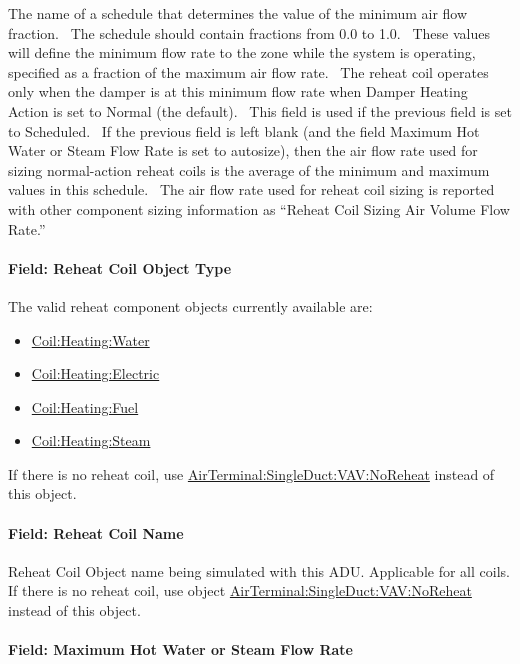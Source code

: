 The name of a schedule that determines the value of the minimum air flow fraction.~ The schedule should contain fractions from 0.0 to 1.0.~ These values will define the minimum flow rate to the zone while the system is operating, specified as a fraction of the maximum air flow rate.~ The reheat coil operates only when the damper is at this minimum flow rate when Damper Heating Action is set to Normal (the default).~ This field is used if the previous field is set to Scheduled.~ If the previous field is left blank (and the field Maximum Hot Water or Steam Flow Rate is set to autosize), then the air flow rate used for sizing normal-action reheat coils is the average of the minimum and maximum values in this schedule.~ The air flow rate used for reheat coil sizing is reported with other component sizing information as ``Reheat Coil Sizing Air Volume Flow Rate.''

\paragraph{Field: Reheat Coil Object Type}\label{field-reheat-coil-object-type-1}

The valid reheat component objects currently available are:

\begin{itemize}
\item
  \hyperref[coilheatingwater]{Coil:Heating:Water}
\item
  \hyperref[coilheatingelectric]{Coil:Heating:Electric}
\item
  \hyperref[coilheatinggas-000]{Coil:Heating:Fuel}
\item
  \hyperref[coilheatingsteam]{Coil:Heating:Steam}
\end{itemize}

If there is no reheat coil, use \hyperref[airterminalsingleductvavnoreheat]{AirTerminal:SingleDuct:VAV:NoReheat} instead of this object.

\paragraph{Field: Reheat Coil Name}\label{field-reheat-coil-name-1}

Reheat Coil Object name being simulated with this ADU. Applicable for all coils. If there is no reheat coil, use object \hyperref[airterminalsingleductvavnoreheat]{AirTerminal:SingleDuct:VAV:NoReheat} instead of this object.

\paragraph{Field: Maximum Hot Water or Steam Flow Rate}\label{field-maximum-hot-water-or-steam-flow-rate-1}

